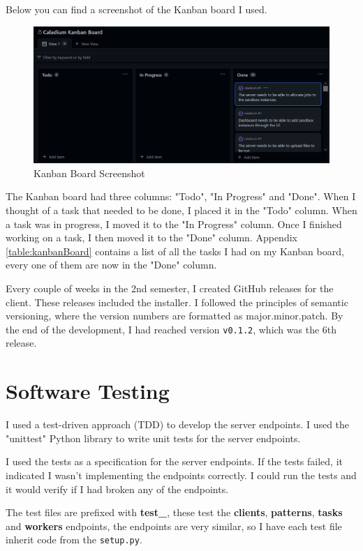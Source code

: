 Below you can find a screenshot of the Kanban board I used.
\begin{figure}[h!]
    \centering
    \label{image:kanbanBoardScreenshot}
    \includegraphics[width=1\textwidth]{images/screenshots/kanban_board}
    \caption{Kanban Board Screenshot}
\end{figure}

The Kanban board had three columns: "Todo", "In Progress" and "Done".
When I thought of a task that needed to be done,
I placed it in the "Todo" column.
When a task was in progress, I moved it to the "In Progress" column.
Once I finished working on a task, I then moved it to the "Done" column.
Appendix \ref{table:kanbanBoard} contains a list of
all the tasks I had on my Kanban board,
every one of them are now in the "Done" column.

Every couple of weeks in the 2nd semester,
I created GitHub releases for the client.
These releases included the installer.
I followed the principles of semantic versioning,
where the version numbers are formatted as major.minor.patch.
By the end of the development,
I had reached version \texttt{v0.1.2}, which was the 6th release.

\section{Software Testing}
I used a test-driven approach (TDD) to develop the server endpoints.
I used the "unittest" Python library to write unit tests for the server endpoints.

I used the tests as a specification for the server endpoints.
If the tests failed, it indicated I wasn't implementing the endpoints correctly.
I could run the tests and it would verify if I had broken any of the endpoints.

The test files are prefixed with \textbf{test\_},
these test the \textbf{clients}, \textbf{patterns},
\textbf{tasks} and \textbf{workers} endpoints,
the endpoints are very similar, so I have each test file
inherit code from the \texttt{setup.py}.

